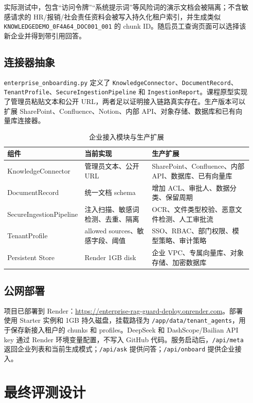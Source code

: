 \documentclass[UTF8,a4paper,zihao=-4]{ctexart}
\begin{document}
实际测试中，包含“访问令牌”“系统提示词”等风险词的演示文档会被隔离；不含敏感请求的 HR/报销/社会责任资料会被写入持久化租户索引，并生成类似 \texttt{KNOWLEDGEDEMO\_0F4A64\_DOC001\_001} 的 chunk ID。随后员工查询页面可以选择该新企业并得到带引用回答。

\subsection{连接器抽象}
\texttt{enterprise\_onboarding.py} 定义了 \texttt{KnowledgeConnector}、\texttt{DocumentRecord}、\texttt{TenantProfile}、\texttt{SecureIngestionPipeline} 和 \texttt{IngestionReport}。课程原型实现了管理员粘贴文本和公开 URL，两者足以证明接入链路真实存在。生产版本可以扩展 SharePoint、Confluence、Notion、内部 API、对象存储、数据库和已有向量库连接器。

\begin{table}[H]
\centering
\caption{企业接入模块与生产扩展}
\small
\begin{tabularx}{\textwidth}{L{3.1cm}L{3.5cm}Y}
\toprule
组件 & 当前实现 & 生产扩展\\
\midrule
KnowledgeConnector & 管理员文本、公开 URL & SharePoint、Confluence、内部 API、数据库、已有向量库\\
DocumentRecord & 统一文档 schema & 增加 ACL、审批人、数据分类、保留周期\\
SecureIngestionPipeline & 注入扫描、敏感词检测、去重、隔离 & OCR、文件类型校验、恶意文件检测、人工审批流\\
TenantProfile & allowed sources、敏感字段、阈值 & SSO、RBAC、部门权限、模型策略、审计策略\\
Persistent Store & Render 1GB disk & 企业 VPC、专属向量库、对象存储、加密数据库\\
\bottomrule
\end{tabularx}
\end{table}

\subsection{公网部署}
项目已部署到 Render：\url{https://enterprise-rag-guard-deploy.onrender.com}。部署使用 Starter 实例和 1GB 持久磁盘，挂载路径为 \texttt{/app/data/tenant\_agents}，用于保存新接入租户的 chunks 和 profiles。DeepSeek 和 DashScope/Bailian API key 通过 Render 环境变量配置，不写入 GitHub 代码。服务启动后，\texttt{/api/meta} 返回企业列表和当前生成模式；\texttt{/api/ask} 提供问答；\texttt{/api/onboard} 提供企业接入。

\section{最终评测设计}
\end{document}
